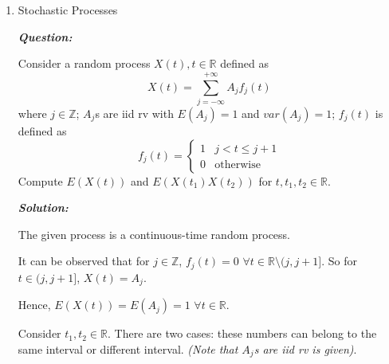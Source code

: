 \documentclass[12pt, oneside]{article}
\begin{document}
\begin{enumerate}
\begin{enumerate}[label=(\alph*)]
\end{enumerate}

\newpage
\item Stochastic Processes

\textbf{\textit{Question:}}



Consider a random process $X(t),t\in\mathbb{R}$ defined as
\[
X(t) = \sum_{j=-\infty}^{+\infty} A_jf_j(t)
\]
where $j\in\mathbb{Z}$; $A_j$s are iid rv with $E(A_j) = 1$ and $var(A_j) = 1$; $f_j(t)$ is defined as
\[ f_j(t) =
\begin{cases}
1 & j < t \le j+1 \\
0 & \text{otherwise}
\end{cases}
\]
Compute $E(X(t))$ and $E(X(t_1)X(t_2))$ for $t,t_1,t_2 \in \mathbb{R}$.




\textbf{\textit{Solution:}}




        The given process is a continuous-time random process.
        
        It can be observed that for $j \in \mathbb{Z}$, $f_j(t)=0$ $\forall t \in \mathbb{R} \setminus (j,j+1]$. So for $t\in (j,j+1] $, $X(t) = A_j$.
        
        Hence, $E(X(t)) = E(A_j) = 1$ $\forall t \in \mathbb{R}$.
        
        Consider $t_1,t_2 \in \mathbb{R}$. There are two cases: these numbers can belong to the same interval or different interval. \textit{(Note that $A_j$s are iid rv is given)}.
        

\end{enumerate}
\end{document}
